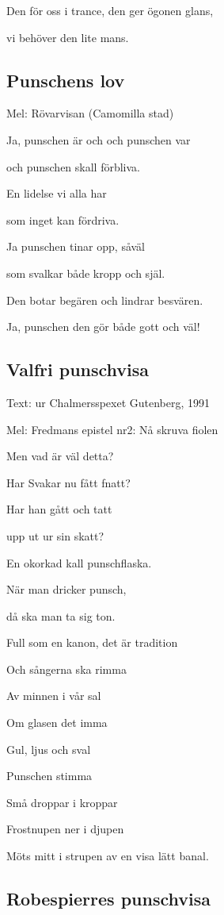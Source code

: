 Den för oss i trance, den ger ögonen glans,

vi behöver den lite mans.

\subsection{\textbf{Punschens lov}}

Mel: Rövarvisan (Camomilla stad)\bigskip

Ja, punschen är och och punschen var

och punschen skall förbliva.

En lidelse vi alla har

som inget kan fördriva.

Ja punschen tinar opp, såväl

som svalkar både kropp och själ.

Den botar begären och lindrar besvären.

Ja, punschen den gör både gott och väl!

\subsection{\textbf{Valfri punschvisa}}

Text: ur Chalmersspexet Gutenberg, 1991

Mel: Fredmans epistel nr2: Nå skruva fiolen\bigskip


Men vad är väl detta?

Har Svakar nu fått fnatt?

Har han gått och tatt

upp ut ur sin skatt?

En okorkad kall punschflaska.\bigskip

När man dricker punsch,

då ska man ta sig ton.

Full som en kanon, det är tradition

Och sångerna ska rimma\bigskip

Av minnen i vår sal

Om glasen det imma

Gul, ljus och sval

Punschen stimma

Små droppar i kroppar

Frostnupen ner i djupen

Möts mitt i strupen av en visa lätt banal.  

\subsection{\textbf{Robespierres punschvisa}}

